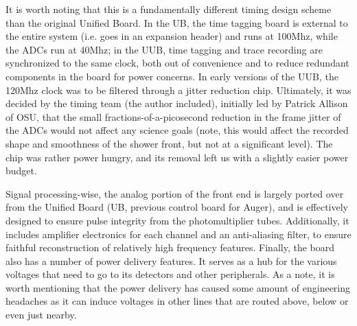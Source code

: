 It is worth noting that this is a fundamentally different timing design scheme than the original Unified Board. In the UB, the time tagging board is external to the entire system (i.e. goes in an expansion header) and runs at 100Mhz, while the ADCs run at 40Mhz; in the UUB, time tagging and trace recording are synchronized to the same clock, both out of convenience and to reduce redundant components in the board for power concerns. In early versions of the UUB, the 120Mhz clock was to be filtered through a jitter reduction chip. Ultimately, it was decided by the timing team (the author included), initially led by Patrick Allison of OSU, that the small fractions-of-a-picosecond reduction in the frame jitter of the ADCs would not affect any science goals (note, this would affect the recorded shape and smoothness of the shower front, but not at a significant level). The chip was rather power hungry, and its removal left us with a slightly easier power budget.

Signal processing-wise, the analog portion of the front end is largely ported over from the Unified Board (UB, previous control board for Auger), and is effectively designed to ensure pulse integrity from the photomultiplier tubes. Additionally, it includes amplifier electronics for each channel and an anti-aliasing filter, to ensure faithful reconstruction of relatively high frequency features. Finally, the board also has a number of power delivery features. It serves as a hub for the various voltages that need to go to its detectors and other peripherals. As a note, it is worth mentioning that the power delivery has caused some amount of engineering headaches as it can induce voltages in other lines that are routed above, below or even just nearby.

